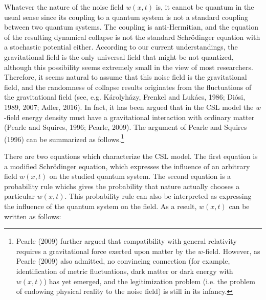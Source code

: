 Whatever the nature of the noise field $w(x, t)$ is, it cannot be quantum in the usual sense since its coupling to a quantum system is not a standard coupling between two quantum systems. The coupling is anti-Hermitian, and the equation of the resulting dynamical collapse is not the standard Schr\"{o}dinger equation with a stochastic potential either. According to our current understandings, the gravitational field is the only universal field that might be not quantized, although this possibility seems extremely small in the view of most researchers. Therefore, it seems natural to assume that this noise field is the gravitational field, and the randomness of collapse results originates from the fluctuations of the gravitational field (see, e.g. K\'{a}rolyh\'{a}zy, Frenkel and Luk\'{a}cs, 1986; Di\'{o}si, 1989, 2007; Adler, 2016).
In fact, it has been argued that in the CSL model the $w$-field energy density must have a gravitational interaction with ordinary matter (Pearle and Squires, 1996; Pearle, 2009). The argument of Pearle and Squires (1996) can be summarized as follows.\footnote{Pearle (2009) further argued that compatibility with general relativity requires a gravitational force exerted upon matter by the $w$-field.  However, as Pearle (2009) also admitted, no convincing connection (for example, identification of metric fluctuations, dark matter or dark energy with $w(x, t)$) has yet emerged, and the legitimization problem (i.e. the problem of endowing physical reality to the noise field) is still in its infancy.}

There are two equations which characterize the CSL model. The first equation is a modified Schr\"{o}dinger equation, which expresses the influence of an arbitrary field $w(x, t)$ on the studied  quantum system. The second equation is a probability rule whichs gives the probability that nature actually chooses a particular $w(x, t)$. This probability rule can also be interpreted as expressing the influence of the quantum system on the field. As a result, $w(x, t)$ can be written as follows:

